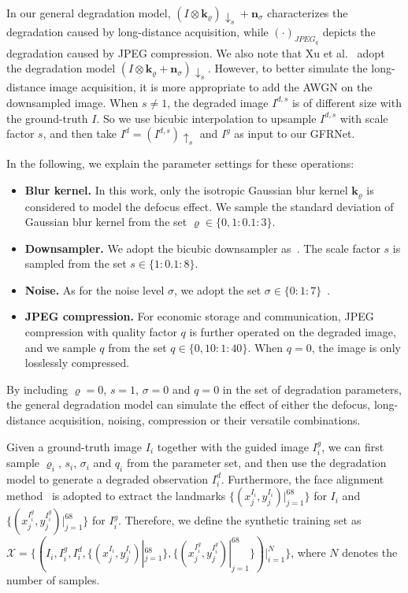 \documentclass[runningheads]{llncs}
\begin{document}
In our general degradation model, ${\left( {I \otimes \mathbf{k}_{\varrho}} \right){ \downarrow _s} + \mathbf{n}_{\sigma}}$ characterizes the degradation caused by long-distance acquisition, while $(\cdot)_{JPEG_q}$ depicts the degradation caused by JPEG compression.
We also note that Xu et al.~\cite{xu2017learning} adopt the degradation model  ${\left( {I \otimes \mathbf{k}_{\varrho}}  + \mathbf{n}_{\sigma} \right){ \downarrow_s}}$.
However, to better simulate the long-distance image acquisition, it is more appropriate to add the AWGN on the downsampled image.
When $s \neq 1$, the degraded image $I^{d,s}$ is of different size with the ground-truth $I$.
So we use bicubic interpolation to upsample $I^{d,s}$ with scale factor $s$, and then take $I^d = (I^{d,s})\uparrow_s$ and $I^g$ as input to our GFRNet.



In the following, we explain the parameter settings for these operations:
\begin{itemize}
 \item \textbf{Blur kernel.} In this work, only the isotropic Gaussian blur kernel $\mathbf{k}_{\varrho}$ is considered to model the defocus effect.
We sample the standard deviation of Gaussian blur kernel from the set $\varrho \in \{0, 1:0.1:3\}$.
 \item \textbf{Downsampler.} We adopt the bicubic downsampler as~\cite{zhu2016deep,cao2017attention,chen2017fsrnet,huang2017wavelet,xu2017learning}. The scale factor $s$ is sampled from the set $s \in \{1:0.1:8\}$.
\item \textbf{Noise.} As for the noise level $\sigma$, we adopt the set $\sigma \in \{0:1:7\}$~\cite{xu2017learning}.
\item \textbf{JPEG compression.} For economic storage and communication, JPEG compression with quality factor $q$ is further operated on the degraded image, and we sample $q$ from the set $q \in \{0, 10:1:40\}$. When $q = 0$, the image is only losslessly compressed.
\end{itemize}
By including $\varrho = 0$, $s=1$, $\sigma=0$ and $q=0$ in the set of degradation parameters, the general degradation model can simulate the effect of either the defocus, long-distance acquisition, noising, compression or their versatile combinations.


Given a ground-truth image $I_i$ together with the guided image $I^g_i$, we can first sample $\varrho_i$, $s_i$, $\sigma_i$ and $q_i$ from the parameter set, and then use the degradation model to generate a degraded observation $I^d_i$.
Furthermore, the face alignment method~\cite{TCDCN} is adopted to extract the landmarks $\{(x^{I_i}_{j}, y^{I_i}_{j})|_{j=1}^{68}\}$ for $I_i$ and $\{(x^{I^g_i}_{j}, y^{I^g_i}_{j})|_{j=1}^{68}\}$ for $I^g_i$.
Therefore, we define the synthetic training set as $\mathcal{X} = \{ (I_i, I^g_i, I^d_i, \{(x^{I_i}_{j}, y^{I_i}_{j})|_{j=1}^{68}\}, \{(x^{I^g_i}_{j}, y^{I^g_i}_{j})|_{j=1}^{68}\})|_{i=1}^N \}$, where $N$ denotes the number of samples.
\end{document}
